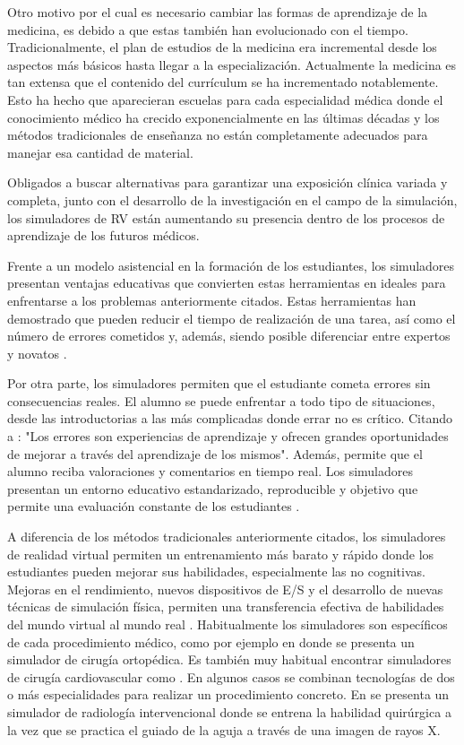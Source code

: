 Otro motivo por el cual es necesario cambiar las formas de aprendizaje de la medicina, es debido a que estas también han evolucionado con el tiempo.
Tradicionalmente, el plan de estudios de la medicina era incremental desde los aspectos más básicos hasta llegar a la especialización. Actualmente la medicina es tan extensa que el contenido del currículum se ha incrementado notablemente. Esto ha hecho que aparecieran escuelas para cada especialidad médica donde el conocimiento médico ha crecido exponencialmente en las últimas décadas y los métodos tradicionales de enseñanza no están completamente adecuados para manejar esa cantidad de material.

Obligados a buscar alternativas para garantizar una exposición clínica variada y completa, junto con el desarrollo de la investigación en el campo de la simulación, los simuladores de \ac{RV} están aumentando su presencia dentro de los procesos de aprendizaje de los futuros médicos.

Frente a un modelo asistencial en la formación de los estudiantes, los simuladores presentan  ventajas educativas que convierten estas herramientas en ideales para enfrentarse a los problemas anteriormente citados. Estas herramientas han demostrado que pueden reducir el tiempo de realización de una tarea, así como el número de errores cometidos y, además, siendo posible diferenciar entre expertos y novatos \cite{Gurusamy08}.

Por otra parte, los simuladores permiten que el estudiante cometa errores sin consecuencias reales. %
El alumno se puede enfrentar a todo tipo de situaciones, desde las introductorias a las más complicadas donde errar no es crítico. Citando a \cite{ziv2008educacion}: "Los errores son experiencias de aprendizaje y ofrecen grandes oportunidades de mejorar a través del aprendizaje de los mismos". Además, permite que el alumno reciba valoraciones y comentarios en tiempo real. Los simuladores presentan un entorno educativo estandarizado, reproducible y objetivo que permite una evaluación constante de los estudiantes .

A diferencia de los métodos tradicionales anteriormente citados, los simuladores de realidad virtual permiten un entrenamiento más barato y rápido donde los estudiantes pueden mejorar sus habilidades, especialmente las no cognitivas. Mejoras en el rendimiento, nuevos dispositivos de \ac{E/S} y el desarrollo de nuevas técnicas de simulación física, permiten una transferencia efectiva de habilidades del mundo virtual al mundo real \cite{dawereview}.
Habitualmente los simuladores son específicos de cada procedimiento médico, como por ejemplo en \cite{cecil2017advanced} donde se presenta un simulador de cirugía ortopédica. Es también muy habitual encontrar simuladores de cirugía cardiovascular como \cite{korzeniowski2018vcsim3}. En algunos casos se combinan tecnologías de dos o más especialidades para realizar un procedimiento concreto. En  \cite{villard2014interventional} se presenta un simulador de radiología intervencional donde se entrena la habilidad quirúrgica a la vez que se practica el guiado de la aguja a través de una imagen de rayos X.

